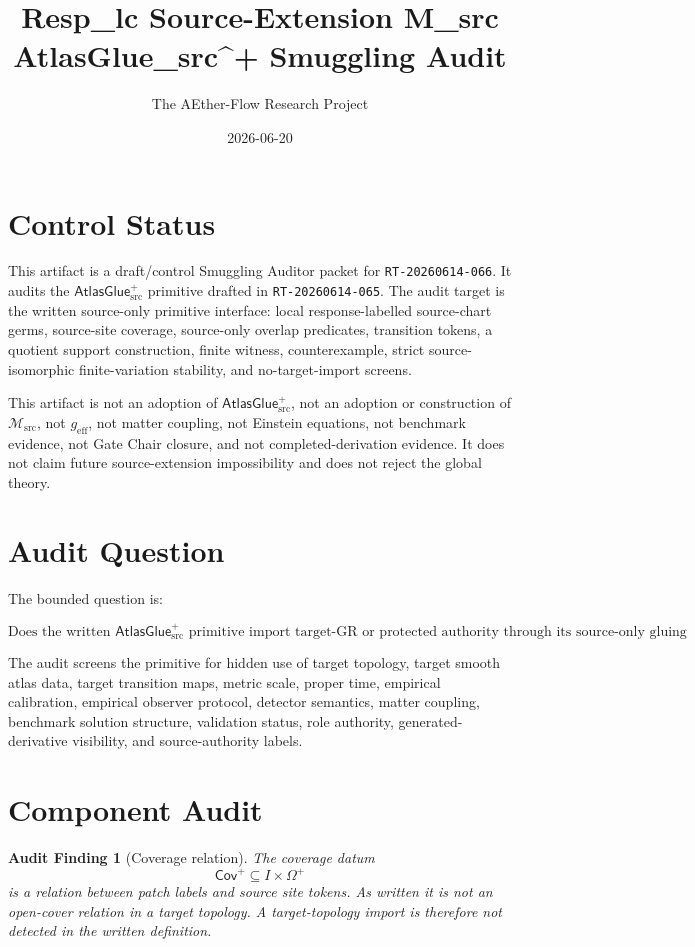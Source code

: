 \documentclass[11pt]{article}
\title{Resp\_lc Source-Extension M\_src AtlasGlue\_src\^{}+ Smuggling Audit}
\author{The AEther-Flow Research Project}
\date{2026-06-20}
\newcommand{\Msrc}{\mathcal{M}_{\mathrm{src}}}
\newcommand{\geff}{g_{\mathrm{eff}}}
\newcommand{\AtlasGlue}{\mathsf{AtlasGlue}_{\mathrm{src}}^{+}}
\newcommand{\Cov}{\mathsf{Cov}^{+}}
\newtheorem{audit}{Audit Finding}
\begin{document}
\maketitle

\section*{Control Status}

This artifact is a draft/control Smuggling Auditor packet for
\texttt{RT-20260614-066}. It audits the \(\AtlasGlue\) primitive drafted in
\texttt{RT-20260614-065}. The audit target is the written source-only
primitive interface: local response-labelled source-chart germs, source-site
coverage, source-only overlap predicates, transition tokens, a quotient
support construction, finite witness, counterexample, strict source-isomorphic
finite-variation stability, and no-target-import screens.

This artifact is not an adoption of \(\AtlasGlue\), not an adoption or
construction of \(\Msrc\), not \(\geff\), not matter coupling, not Einstein
equations, not benchmark evidence, not Gate Chair closure, and not
completed-derivation evidence. It does not claim future source-extension
impossibility and does not reject the global theory.

\section{Audit Question}

The bounded question is:

\[
\text{Does the written }\AtlasGlue\text{ primitive import target-GR or
protected authority through its source-only gluing language?}
\]

The audit screens the primitive for hidden use of target topology, target
smooth atlas data, target transition maps, metric scale, proper time,
empirical calibration, empirical observer protocol, detector semantics, matter
coupling, benchmark solution structure, validation status, role authority,
generated-derivative visibility, and source-authority labels.

\section{Component Audit}

\begin{audit}[Coverage relation]
The coverage datum
\[
  \Cov \subseteq I\times\Omega^+
\]
is a relation between patch labels and source site tokens. As written it is
not an open-cover relation in a target topology. A target-topology import is
therefore not detected in the written definition.
\end{audit}
\end{document}
